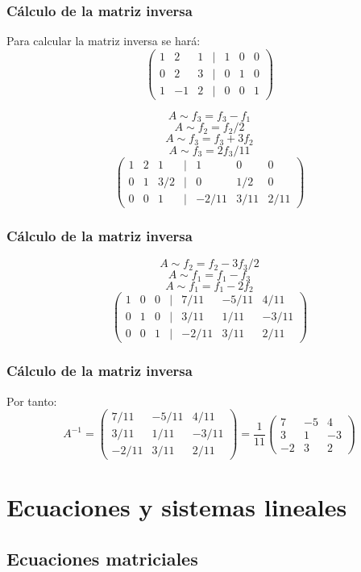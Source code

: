 \documentclass[12pt]{article}
\begin{document}
  
  
      \begin{frame}
  \frametitle{C\'alculo de la matriz inversa}
Para calcular la matriz inversa se har\'a:
\[ \left(\begin{array}{ccccccc}1 & 2 & 1 & | & 1&0&0 \\0 & 2 & 3 &|&0&1&0 \\1 & -1 & 2&|&0&0&1\end{array}\right)\]

\[A\sim f_3 = f_3-f_1\]
\[A\sim f_2 = f_2/2\]
\[A\sim f_3 = f_3+3f_2\]
\[A\sim f_3 = 2f_3/11\]
\[ \left(\begin{array}{ccccccc}1 & 2 & 1 & | &1&0&0 \\0 & 1 & 3/2 &|&0&1/2&0 \\0 & 0 & 1&|&-2/11&3/11&2/11\end{array}\right)\]
  \end{frame} 


     \begin{frame}
  \frametitle{C\'alculo de la matriz inversa}

\[A\sim f_2 = f_2-3f_3/2\]
\[A\sim f_1 = f_1-f_3\]
\[A\sim f_1 = f_1-2f_2\]
\[ \left(\begin{array}{ccccccc}1 & 0 & 0 & | &7/11&-5/11&4/11 \\0 & 1 & 0 &|&3/11&1/11&-3/11 \\0 & 0 & 1&|&-2/11&3/11&2/11\end{array}\right)\]
  \end{frame} 
  
       \begin{frame}
  \frametitle{C\'alculo de la matriz inversa}
Por tanto:
\[A^{-1}= \left(\begin{array}{ccc}7/11&-5/11&4/11 \\3/11&1/11&-3/11 \\-2/11&3/11&2/11\end{array}\right) =
\frac{1}{11}\left(\begin{array}{ccc}7&-5&4 \\3&1&-3 \\-2&3&2\end{array}\right) \]
  \end{frame} 
  
    \section{Ecuaciones y sistemas lineales}
  \subsection{Ecuaciones matriciales}
\end{document}
